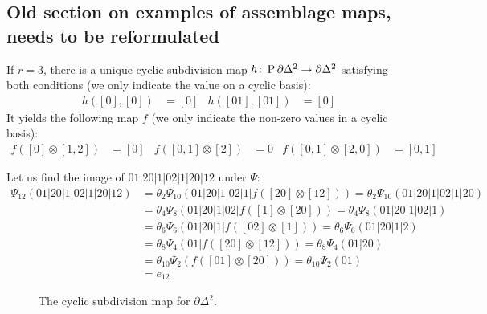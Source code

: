 \subsection{Old section on examples of assemblage maps, needs to be reformulated}
If $r=3$, there is a unique cyclic subdivision map $h\colon \operatorname{P} \partial \Delta^{2}\to \partial \Delta^2$ satisfying both conditions (we only indicate the value on a cyclic basis):
\begin{align*}
    h([0],[0]) &= [0] &
    h([01],[01]) &= [0]
\end{align*}
It yields the following map $f$ (we only indicate the non-zero values in a cyclic basis):
\begin{align*}
f([0]\otimes [1,2]) &= [0] &
f([0,1]\otimes [2])&=0 &
f([0,1]\otimes [2,0]) &= [0,1]
\end{align*}
\begin{example}\label{ex:107}
    Let us find the image of $01|20|1|02|1|20|12$ under $\Psi$:
    \begin{align*}
        \Psi_{12}(01|20|1|02|1|20|12) &= \theta_2\Psi_{10}(01|20|1|02|1|f([20]\otimes[12])) = \theta_2\Psi_{10}(01|20|1|02|1|20)
        \\ &= \theta_4\Psi_8(01|20|1|02|f([1]\otimes [20])) = \theta_4\Psi_8(01|20|1|02|1)
        \\ &= \theta_6\Psi_6(01|20|1|f([02]\otimes [1])) = \theta_6\Psi_6(01|20|1|2)
        \\ &= \theta_8\Psi_4(01|f([20]\otimes [12])) = \theta_8\Psi_4(01|20)
        \\ &= \theta_{10}\Psi_2(f([01]\otimes [20])) = \theta_{10}\Psi_2(01)
        \\ &= e_{12}
    \end{align*}
\end{example}
\begin{figure}
\caption{The cyclic subdivision map for $\partial \Delta^2$.}
\end{figure}

